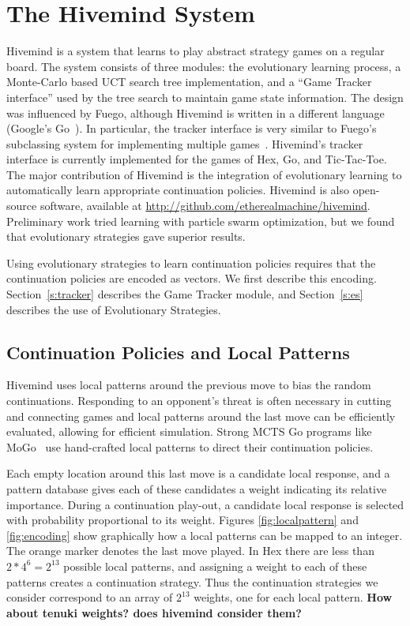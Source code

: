 \documentclass{acm_proc_article-sp}
\begin{document}
\section{The Hivemind System}\label{hivemind}

Hivemind is a system that learns to play abstract strategy games on a regular board. 
The system consists of three modules: the evolutionary learning process, a Monte-Carlo based UCT search tree implementation, and a ``Game Tracker interface'' used by the tree search to maintain game state information. 
The design was influenced by Fuego, although Hivemind is written in a different language (Google's Go~\cite{golang}). 
In particular, the tracker interface is very similar to Fuego's subclassing system for implementing multiple games~\cite{Fuego}. 
Hivemind's tracker interface is currently implemented for the games of Hex, Go, and Tic-Tac-Toe. 
The major contribution of Hivemind is the integration of evolutionary learning to automatically learn appropriate continuation policies.
Hivemind is also open-source software, available at \url{http://github.com/etherealmachine/hivemind}.
Preliminary work tried learning with particle swarm optimization, but we found that evolutionary strategies gave
superior results.

Using evolutionary strategies to learn continuation policies requires that the continuation policies are encoded as vectors.
We first describe this encoding.  Section~\ref{s:tracker} describes the Game Tracker module, and Section~\ref{s:es} describes the
use of Evolutionary Strategies.

\subsection{Continuation Policies and Local Patterns}
\label{s:policies}

Hivemind uses local patterns around the previous move to bias the random continuations.
Responding to an opponent's threat is often necessary in cutting and connecting games
and local patterns around the last move can be efficiently evaluated, allowing for efficient simulation.
Strong MCTS Go programs like MoGo~\cite{gelly2006modification} use hand-crafted local patterns to direct their  continuation policies.

Each empty location around this last move is a candidate local response, and a pattern database gives each of these candidates a
weight indicating its relative importance.
During a continuation play-out, a candidate local response is selected with probability proportional to its weight.
Figures \ref{fig:localpattern} and \ref{fig:encoding} show graphically how a local patterns can be mapped to an integer. 
The orange marker denotes the last move played. 
In Hex there are less than $2 * 4^6=2^{13}$ possible local patterns, and 
assigning a weight to each of these patterns creates a continuation strategy.
Thus the continuation strategies we consider correspond to an array of $2^{13}$ weights, one for each local pattern.
\textbf{How about tenuki weights? does hivemind consider them?}
\end{document}
